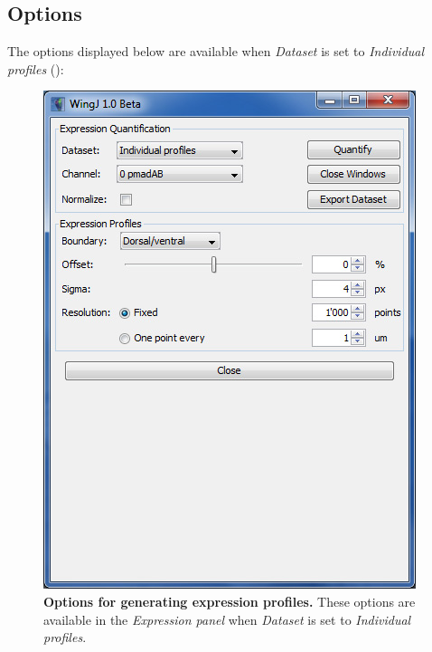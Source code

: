 \subsection{Options}
The options displayed below are available when \textit{Dataset} is set to \textit{Individual profiles} ():

\begin{figure}[!h]
\centering
\includegraphics[scale=0.7]{images/expression_panel_1.jpg}
\caption{\textbf{Options for generating expression profiles.} These options are available in the \textit{Expression panel} when \textit{Dataset} is set to \textit{Individual profiles}.}
\label{fig:wingj_expression_profiles_interface}
\end{figure}

